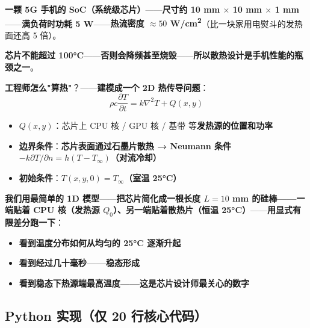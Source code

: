 \begin{tcolorbox}[ahabox={\Large Aha 例子：手机芯片散热}]
\textbf{一颗 5G 手机的 SoC（系统级芯片）}——\textbf{尺寸约 10 mm $\times$ 10 mm $\times$ 1 mm}——\textbf{满负荷时功耗 5 W}——\textbf{热流密度 $\approx 50$ W/cm\textsuperscript{2}}（比一块家用电熨斗的发热面还高 5 倍）。

\medskip

\textbf{芯片不能超过 100°C}——\textbf{否则会降频甚至烧毁}——\textbf{所以散热设计是手机性能的瓶颈之一}。

\medskip

\textbf{工程师怎么"算热"}？——\textbf{建模成一个 2D 热传导问题}：
\[
\rho c \frac{\partial T}{\partial t} = k \nabla^2 T + Q(x, y)
\]
\begin{itemize}
\item \textbf{$Q(x, y)$}：芯片上 CPU 核 / GPU 核 / 基带 等\textbf{发热源的位置和功率}
\item \textbf{边界条件}：\textbf{芯片表面通过石墨片散热 → Neumann 条件 $-k \partial T / \partial n = h(T - T_\infty)$（对流冷却）}
\item \textbf{初始条件}：\textbf{$T(x,y,0) = T_\infty$（室温 25°C）}
\end{itemize}

\medskip

\textbf{我们用最简单的 1D 模型}——\textbf{把芯片简化成一根长度 $L = 10$ mm 的硅棒——一端贴着 CPU 核（发热源 $Q_0$）、另一端贴着散热片（恒温 25°C）}——\textbf{用显式有限差分跑一下}：

\begin{itemize}
\item \textbf{看到温度分布如何\textbf{从均匀的 25°C 逐渐\textbf{升起}}}
\item \textbf{看到经过几十毫秒——\textbf{稳态形成}}
\item \textbf{看到稳态下\textbf{热源端最高温度}——这是芯片设计师最关心的数字}
\end{itemize}
\end{tcolorbox}

\subsection{Python 实现（仅 20 行核心代码）}

